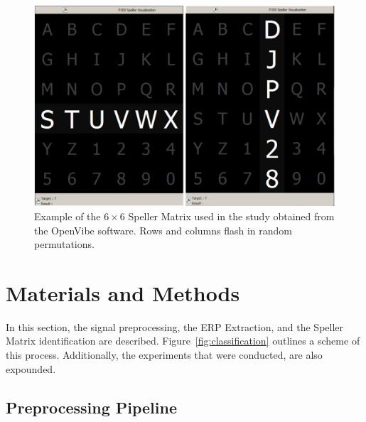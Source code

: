 \begin{figure}[h!]
\centering
\includegraphics[width=15cm]{images/openvibep300matrix.png}
\caption[P300 Speller Matrix]{Example of the $6 \times 6$ Speller Matrix used in the study obtained from the OpenVibe software.  Rows and columns flash in random permutations.}
\label{fig:p300matrix}
\end{figure}



\section{Materials and Methods}


In this section, the signal preprocessing, the ERP Extraction, and the Speller Matrix identification are described.  Figure~\ref{fig:classification} outlines a scheme of this process. Additionally, the experiments that were conducted, are also expounded.

\subsection{Preprocessing Pipeline} \label{Pipeline}

